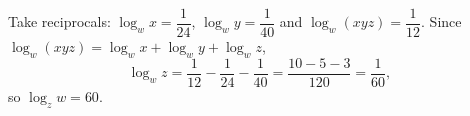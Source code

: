Take reciprocals: $\log_wx=\dfrac{1}{24}$, $\log_wy=\dfrac{1}{40}$ and $\log_w(xyz)=\dfrac{1}{12}$. Since $\log_w(xyz)=\log_wx+\log_wy+\log_wz$,
\[
\log_wz=\dfrac{1}{12}-\dfrac{1}{24}-\dfrac{1}{40}=\dfrac{10-5-3}{120}=\dfrac{1}{60},
\]
so $\log_zw=\boxed{60}$.
